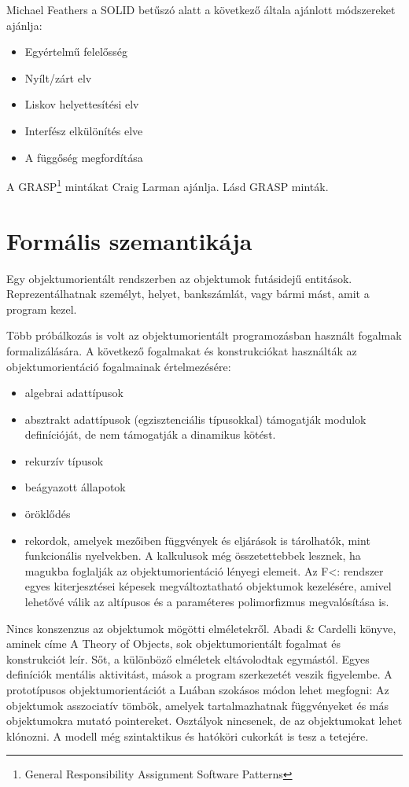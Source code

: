 \documentclass[a4paper,12pt,twoside]{report}
\theoremstyle{definition}
\begin{document}
	Michael Feathers a SOLID betűszó alatt a következő általa ajánlott módszereket ajánlja:
	\begin{itemize}
		\item Egyértelmű felelősség
		\item Nyílt/zárt elv
		\item Liskov helyettesítési elv
		\item Interfész elkülönítés elve
		\item A függőség megfordítása
	\end{itemize}
	A GRASP\footnote{General Responsibility Assignment Software Patterns} mintákat Craig Larman ajánlja. Lásd GRASP minták.
	
	\chapter{Formális szemantikája}\label{fejezet-formsz}
	
	Egy objektumorientált rendszerben az objektumok futásidejű entitások. Reprezentálhatnak személyt, helyet, bankszámlát, vagy bármi mást, amit a program kezel.
	
	Több próbálkozás is volt az objektumorientált programozásban használt fogalmak formalizálására. A következő fogalmakat és konstrukciókat használták az objektumorientáció fogalmainak értelmezésére:
	
	\begin{itemize}
		\item algebrai adattípusok
		\item absztrakt adattípusok (egzisztenciális típusokkal) támogatják modulok definícióját, de nem támogatják a dinamikus kötést.
		\item rekurzív típusok
		\item beágyazott állapotok
		\item öröklődés
		\item rekordok, amelyek mezőiben függvények és eljárások is tárolhatók, mint funkcionális nyelvekben. A kalkulusok még összetettebbek lesznek, ha magukba foglalják az objektumorientáció lényegi elemeit. Az F<: rendszer egyes kiterjesztései képesek megváltoztatható objektumok kezelésére, amivel lehetővé válik az altípusos és a paraméteres polimorfizmus megvalósítása is.
	\end{itemize}

	Nincs konszenzus az objektumok mögötti elméletekről. Abadi \& Cardelli könyve, aminek címe A Theory of Objects, sok objektumorientált fogalmat és konstrukciót leír. Sőt, a különböző elméletek eltávolodtak egymástól. Egyes definíciók mentális aktivitást, mások a program szerkezetét veszik figyelembe. A prototípusos objektumorientációt a Luában szokásos módon lehet megfogni: Az objektumok asszociatív tömbök, amelyek tartalmazhatnak függvényeket és más objektumokra mutató pointereket. Osztályok nincsenek, de az objektumokat lehet klónozni. A modell még szintaktikus és hatóköri cukorkát is tesz a tetejére.
	
\end{document}
